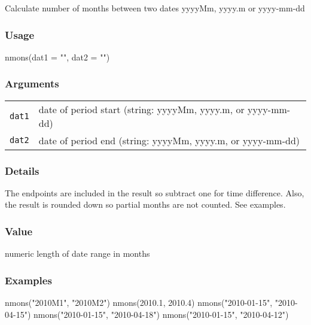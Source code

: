 \documentclass[
  letterpaper,
  DIV=11,
  numbers=noendperiod]{scrreport}
\newenvironment{Shaded}{\begin{snugshade}}{\end{snugshade}}
\newcommand{\AttributeTok}[1]{\textcolor[rgb]{0.40,0.45,0.13}{#1}}
\newcommand{\FloatTok}[1]{\textcolor[rgb]{0.68,0.00,0.00}{#1}}
\newcommand{\FunctionTok}[1]{\textcolor[rgb]{0.28,0.35,0.67}{#1}}
\newcommand{\NormalTok}[1]{\textcolor[rgb]{0.00,0.23,0.31}{#1}}
\newcommand{\StringTok}[1]{\textcolor[rgb]{0.13,0.47,0.30}{#1}}
\begin{document}
Calculate number of months between two dates yyyyMm, yyyy.m or
yyyy-mm-dd

\subsubsection{Usage}\label{usage-16}

\begin{Shaded}
\begin{Highlighting}[]
\FunctionTok{nmons}\NormalTok{(}\AttributeTok{dat1 =} \StringTok{""}\NormalTok{, }\AttributeTok{dat2 =} \StringTok{""}\NormalTok{)}
\end{Highlighting}
\end{Shaded}

\subsubsection{Arguments}\label{arguments-16}

\begin{longtable}[]{@{}ll@{}}
\toprule\noalign{}
\endhead
\bottomrule\noalign{}
\endlastfoot
\texttt{dat1} & date of period start (string: yyyyMm, yyyy.m, or
yyyy-mm-dd) \\
\texttt{dat2} & date of period end (string: yyyyMm, yyyy.m, or
yyyy-mm-dd) \\
\end{longtable}

\subsubsection{Details}\label{details-7}

The endpoints are included in the result so subtract one for time
difference. Also, the result is rounded down so partial months are not
counted. See examples.

\subsubsection{Value}\label{value-16}

numeric length of date range in months

\subsubsection{Examples}\label{examples-16}

\begin{Shaded}
\begin{Highlighting}[]
\FunctionTok{nmons}\NormalTok{(}\StringTok{"2010M1"}\NormalTok{, }\StringTok{"2010M2"}\NormalTok{)}
\FunctionTok{nmons}\NormalTok{(}\FloatTok{2010.1}\NormalTok{, }\FloatTok{2010.4}\NormalTok{)}
\FunctionTok{nmons}\NormalTok{(}\StringTok{"2010{-}01{-}15"}\NormalTok{, }\StringTok{"2010{-}04{-}15"}\NormalTok{)}
\FunctionTok{nmons}\NormalTok{(}\StringTok{"2010{-}01{-}15"}\NormalTok{, }\StringTok{"2010{-}04{-}18"}\NormalTok{)}
\FunctionTok{nmons}\NormalTok{(}\StringTok{"2010{-}01{-}15"}\NormalTok{, }\StringTok{"2010{-}04{-}12"}\NormalTok{)}
\end{Highlighting}
\end{Shaded}
\end{document}
